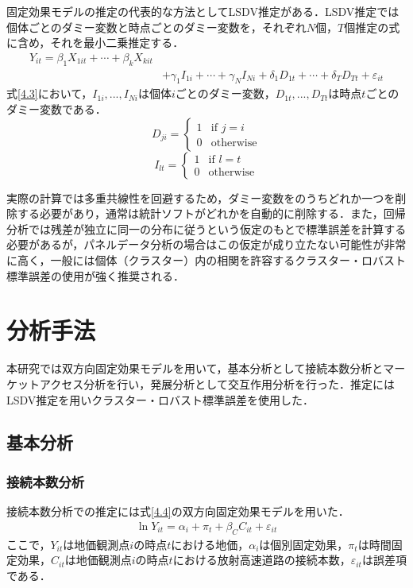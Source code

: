 固定効果モデルの推定の代表的な方法としてLSDV推定がある．LSDV推定では個体ごとのダミー変数と時点ごとのダミー変数を，それぞれ$N$個，$T$個推定の式に含め，それを最小二乗推定する．
\begin{equation}
  \begin{aligned}
    Y_{it} = \beta_{1}X_{1it} + \cdots  + \beta_{k}X_{kit} \\
    &+ \gamma_{1}I_{1i} + \cdots + \gamma_{N}I_{Ni} + \delta_{1}D_{1t} + \cdots + \delta_{T}D_{Tt} + \varepsilon_{it}
  \end{aligned}
  \label{4.3} 
\end{equation}
式\ref{4.3}において，$I_{1i},...,I_{Ni}$は個体$i$ごとのダミー変数，$D_{1t},...,D_{Tt}$は時点$t$ごとのダミー変数である．
\begin{equation}
  D_{ji} =
  \begin{cases}
    1 & \text{if } j = i \\
    0 & \text{otherwise}
  \end{cases}
\end{equation}
\begin{equation}
  I_{lt} =
  \begin{cases}
    1 & \text{if } l = t \\
    0 & \text{otherwise}
  \end{cases}
\end{equation}

実際の計算では多重共線性を回避するため，ダミー変数をのうちどれか一つを削除する必要があり，通常は統計ソフトがどれかを自動的に削除する．また，回帰分析では残差が独立に同一の分布に従うという仮定のもとで標準誤差を計算する必要があるが，パネルデータ分析の場合はこの仮定が成り立たない可能性が非常に高く，一般には個体（クラスター）内の相関を許容するクラスター・ロバスト標準誤差の使用が強く推奨される．

\section{分析手法}
本研究では双方向固定効果モデルを用いて，基本分析として接続本数分析とマーケットアクセス分析を行い，発展分析として交互作用分析を行った．推定にはLSDV推定を用いクラスター・ロバスト標準誤差を使用した．
\subsection{基本分析}
\subsubsection{接続本数分析}
接続本数分析での推定には式\ref{4.4}の双方向固定効果モデルを用いた．
\begin{eqnarray}
    \ln{Y_{it}}= \alpha_{i} + \pi_{t} + \beta_{C}C_{it} + \varepsilon_{it}
  \label{4.4}
\end{eqnarray}
ここで，$Y_{it}$は地価観測点$i$の時点$t$における地価，$\alpha_{i}$は個別固定効果，$\pi_{t}$は時間固定効果，$C_{it}$は地価観測点$i$の時点$t$における放射高速道路の接続本数，$\varepsilon_{it}$は誤差項である．

